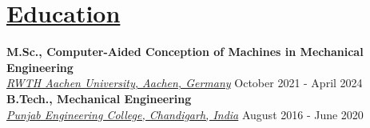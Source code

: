 \section{\underline{Education}}
\large\textbf{M.Sc., Computer-Aided Conception of Machines in Mechanical Engineering}
\hfill\mastersgrade\\
\large\href{https://www.rwth-aachen.de/go/id/a/?lidx=1}{\emph{RWTH Aachen University, Aachen, Germany}}
\hfill October 2021 - April 2024\\

\large\textbf{B.Tech., Mechanical Engineering}
\hfill\cgpa\\
\large\href{https://pec.ac.in/}{\emph{Punjab Engineering College, Chandigarh, India}}
\hfill August 2016 - June 2020\\
\vspace{-1.5 em}